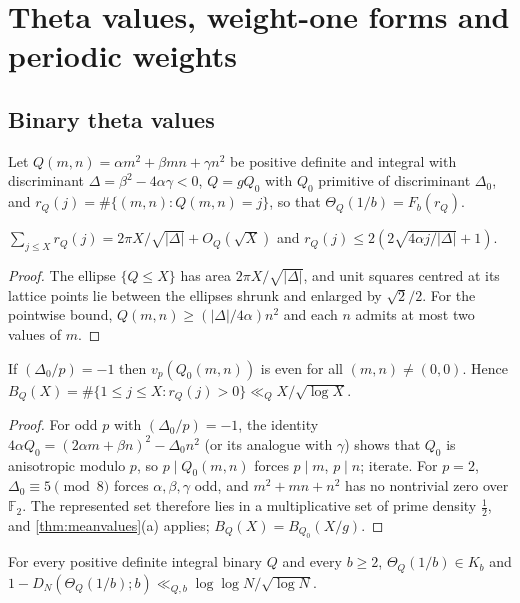 \documentclass[11pt]{article}
\newcommand{\cnt}{\#}
\newcommand{\LL}{\log\log N}
\begin{document}
\section{Theta values, weight-one forms and periodic weights}\label{sec:theta}

\subsection{Binary theta values}\label{subsec:thetaupper}

Let $Q(m,n)=\alpha m^2+\beta mn+\gamma n^2$ be positive definite and integral with discriminant
$\Delta=\beta^2-4\alpha\gamma<0$, $Q=gQ_0$ with $Q_0$ primitive of discriminant $\Delta_0$, and
$r_Q(j)=\cnt\{(m,n):Q(m,n)=j\}$, so that $\Theta_Q(1/b)=F_b(r_Q)$.

\begin{lemma}\label{lem:lattice}
$\sum_{j\le X}r_Q(j)=2\pi X/\sqrt{|\Delta|}+O_Q(\sqrt X)$ and
$r_Q(j)\le2(2\sqrt{4\alpha j/|\Delta|}+1)$.
\end{lemma}

\begin{proof}
The ellipse $\{Q\le X\}$ has area $2\pi X/\sqrt{|\Delta|}$, and unit squares centred at its lattice
points lie between the ellipses shrunk and enlarged by $\sqrt2/2$. For the pointwise bound,
$Q(m,n)\ge(|\Delta|/4\alpha)n^2$ and each $n$ admits at most two values of $m$.
\end{proof}

\begin{lemma}\label{lem:bernays}
If $(\Delta_0/p)=-1$ then $v_p(Q_0(m,n))$ is even for all $(m,n)\ne(0,0)$. Hence
$B_Q(X)=\cnt\{1\le j\le X:r_Q(j)>0\}\ll_QX/\sqrt{\log X}$.
\end{lemma}

\begin{proof}
For odd $p$ with $(\Delta_0/p)=-1$, the identity $4\alpha Q_0=(2\alpha m+\beta n)^2-\Delta_0n^2$
(or its analogue with $\gamma$) shows that $Q_0$ is anisotropic modulo $p$, so $p\mid Q_0(m,n)$
forces $p\mid m$, $p\mid n$; iterate. For $p=2$, $\Delta_0\equiv5\pmod8$ forces $\alpha,\beta,\gamma$
odd, and $m^2+mn+n^2$ has no nontrivial zero over $\mathbb F_2$. The represented set therefore
lies in a multiplicative set of prime density $\frac12$, and \cref{thm:meanvalues}(a) applies;
$B_Q(X)=B_{Q_0}(X/g)$.
\end{proof}

\begin{theorem}\label{thm:thetaupper}
For every positive definite integral binary $Q$ and every $b\ge2$, $\Theta_Q(1/b)\in K_b$ and
$1-D_N(\Theta_Q(1/b);b)\ll_{Q,b}\LL/\sqrt{\log N}$.
\end{theorem}
\end{document}
